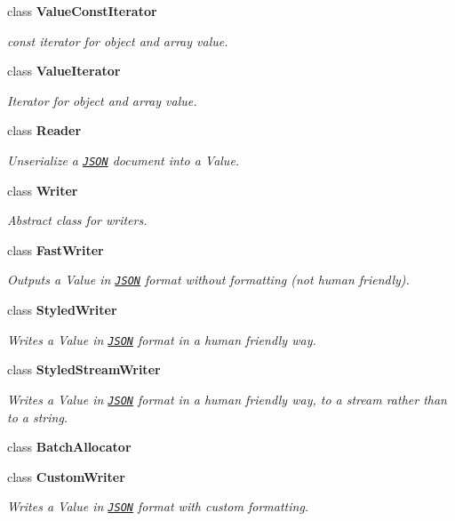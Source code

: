 \begin{DoxyCompactItemize}
class {\bfseries Value\-Const\-Iterator}
\begin{DoxyCompactList}\small\item\em const iterator for object and array value. \end{DoxyCompactList}\item 
class {\bfseries Value\-Iterator}
\begin{DoxyCompactList}\small\item\em Iterator for object and array value. \end{DoxyCompactList}\item 
class {\bfseries Reader}
\begin{DoxyCompactList}\small\item\em Unserialize a \href{http://www.json.org}{\tt J\-S\-O\-N} document into a Value. \end{DoxyCompactList}\item 
class {\bfseries Writer}
\begin{DoxyCompactList}\small\item\em Abstract class for writers. \end{DoxyCompactList}\item 
class {\bfseries Fast\-Writer}
\begin{DoxyCompactList}\small\item\em Outputs a Value in \href{http://www.json.org}{\tt J\-S\-O\-N} format without formatting (not human friendly). \end{DoxyCompactList}\item 
class {\bfseries Styled\-Writer}
\begin{DoxyCompactList}\small\item\em Writes a Value in \href{http://www.json.org}{\tt J\-S\-O\-N} format in a human friendly way. \end{DoxyCompactList}\item 
class {\bfseries Styled\-Stream\-Writer}
\begin{DoxyCompactList}\small\item\em Writes a Value in \href{http://www.json.org}{\tt J\-S\-O\-N} format in a human friendly way, to a stream rather than to a string. \end{DoxyCompactList}\item 
class {\bfseries Batch\-Allocator}
\item 
class {\bfseries Custom\-Writer}
\begin{DoxyCompactList}\small\item\em Writes a Value in \href{http://www.json.org}{\tt J\-S\-O\-N} format with custom formatting. \end{DoxyCompactList}\end{DoxyCompactItemize}
